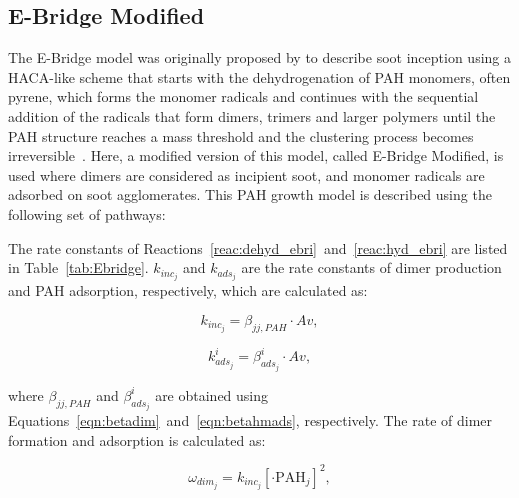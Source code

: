 \subsection{E-Bridge Modified}
\label{sec:ebrimod}
The E-Bridge model was originally proposed by \citet{frenklach2020mechanism} to describe soot inception using a HACA-like scheme that starts with the dehydrogenation of PAH monomers, often pyrene, which forms the monomer radicals and continues with the sequential addition of the radicals that form dimers, trimers and larger polymers until the PAH structure reaches a mass threshold and the clustering process becomes irreversible~\citep{frenklach2020mechanism}. Here, a modified version of this model, called E-Bridge Modified, is used where dimers are considered as incipient soot, and monomer radicals are adsorbed on soot agglomerates. This PAH growth model is described using the following set of pathways:




The rate constants of Reactions~\eqref{reac:dehyd_ebri}~and~\eqref{reac:hyd_ebri} are listed in Table~\ref{tab:Ebridge}. $k_{inc_j}$ and $k_{ads_j}$ are the rate constants of dimer production and PAH adsorption, respectively, which are calculated as:

\begin{equation}
	k_{inc_j}=
	\beta_{jj,PAH}\cdot Av
	\label{eqn:kdim_ebri},
\end{equation}

\begin{equation}
	k^i_{ads_{j}}=
	\beta^i_{ads_j}\cdot Av
	\label{eqn:kads_ebir},
\end{equation}

\noindent where $\beta_{jj,PAH}$ and $\beta^i_{ads_j}$ are obtained using Equations~\eqref{eqn:betadim}~and~\eqref{eqn:betahmads}, respectively. The rate of dimer formation and adsorption is calculated as:

\begin{equation}
	\omega_{dim_j} = k_{inc_{j}} [\cdot{\mathrm{PAH}}_j]^2,
	\label{eqn:wdim_ebri}
\end{equation}

